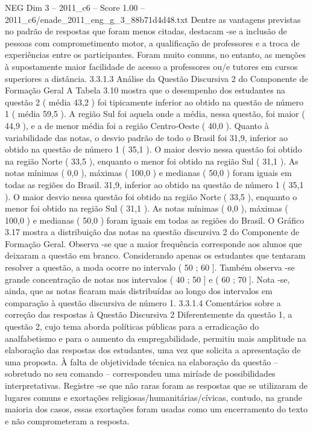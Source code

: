 \begin{textsample}{NEG Dim 3 – 2011\_c6 – Score 1.00 – 2011\_c6/enade\_2011\_eng\_g\_3\_88b71d4d48.txt}
Dentre as vantagens previstas no padrão de respostas que foram menos citadas, destacam -se a inclusão de pessoas com comprometimento motor, a qualificação de professores e a troca de experiências entre os participantes.
Foram muito comuns, no entanto, as menções à supostamente maior facilidade de acesso a professores ou/e tutores em cursos superiores a distância. 3.3.1.3 Análise da Questão Discursiva 2 do Componente de Formação Geral A Tabela 3.10 mostra que o desempenho dos estudantes na questão 2 ( média 43,2 ) foi tipicamente inferior ao obtido na questão de número 1 ( média 59,5 ).
A região Sul foi aquela onde a média, nessa questão, foi maior ( 44,9 ), e a de menor média foi a região Centro-Oeste ( 40,0 ).
Quanto à variabilidade das notas, o desvio padrão de todo o Brasil foi 31,9, inferior ao obtido na questão de número 1 ( 35,1 ).
O maior desvio nessa questão foi obtido na região Norte ( 33,5 ), enquanto o menor foi obtido na região Sul ( 31,1 ).
As notas mínimas ( 0,0 ), máximas ( 100,0 ) e medianas ( 50,0 ) foram iguais em todas as regiões do Brasil. 31,9, inferior ao obtido na questão de número 1 ( 35,1 ).
O maior desvio nessa questão foi obtido na região Norte ( 33,5 ), enquanto o menor foi obtido na região Sul ( 31,1 ).
As notas mínimas ( 0,0 ), máximas ( 100,0 ) e medianas ( 50,0 ) foram iguais em todas as regiões do Brasil.
O Gráfico 3.17 mostra a distribuição das notas na questão discursiva 2 do Componente de Formação Geral.
Observa -se que a maior frequência corresponde aos alunos que deixaram a questão em branco.
Considerando apenas os estudantes que tentaram resolver a questão, a moda ocorre no intervalo ( 50 ; 60 ].
Também observa -se grande concentração de notas nos intervalos ( 40 ; 50 ] e ( 60 ; 70 ].
Nota -se, ainda, que as notas ficaram mais distribuídas ao longo dos intervalos em comparação à questão discursiva de número 1. 3.3.1.4 Comentários sobre a correção das respostas à Questão Discursiva 2 Diferentemente da questão 1, a questão 2, cujo tema aborda políticas públicas para a erradicação do analfabetismo e para o aumento da empregabilidade, permitiu mais amplitude na elaboração das respostas dos estudantes, uma vez que solicita a apresentação de uma proposta.
À falta de objetividade técnica na elaboração da questão – sobretudo no seu comando – correspondeu uma miríade de possibilidades interpretativas.
Registre -se que não raras foram as respostas que se utilizaram de lugares comuns e exortações religiosas/humanitárias/cívicas, contudo, na grande maioria dos casos, essas exortações foram usadas como um encerramento do texto e não comprometeram a resposta.

\end{textsample}

